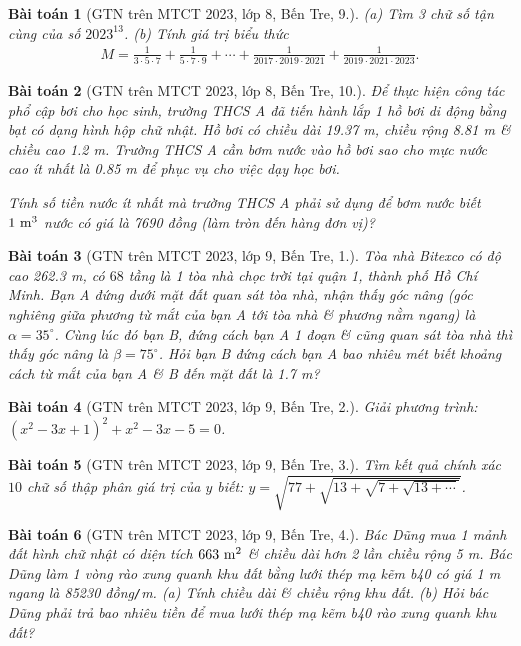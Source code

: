 \documentclass{article}
\newtheorem{baitoan}{Bài toán}
\begin{document}
\begin{baitoan}[GTN trên MTCT 2023, lớp 8, Bến Tre, 9.]
	(a) Tìm 3 chữ số tận cùng của số $2023^{13}$. (b) Tính giá trị biểu thức
	\begin{align*}
		M = \frac{1}{3\cdot5\cdot7} + \frac{1}{5\cdot7\cdot9} + \cdots + \frac{1}{2017\cdot2019\cdot2021} + \frac{1}{2019\cdot2021\cdot2023}.
	\end{align*}
\end{baitoan}

\begin{baitoan}[GTN trên MTCT 2023, lớp 8, Bến Tre, 10.]
	Để thực hiện công tác phổ cập bơi cho học sinh, trường THCS A đã tiến hành lắp 1 hồ bơi di động bằng bạt có dạng hình hộp chữ nhật. Hồ bơi có chiều dài \emph{19.37 m}, chiều rộng \emph{8.81 m} \& chiều cao \emph{1.2 m}. Trường THCS A cần bơm nước vào hồ bơi sao cho mực nước cao ít nhất là \emph{0.85 m} để phục vụ cho việc dạy học bơi.
	
	Tính số tiền nước ít nhất mà trường THCS A phải sử dụng để bơm nước biết $\rm 1\ m^3$ nước có giá là \emph{7690 đồng} (làm tròn đến hàng đơn vị)?
\end{baitoan}

\begin{baitoan}[GTN trên MTCT 2023, lớp 9, Bến Tre, 1.]
	Tòa nhà Bitexco có độ cao \emph{262.3 m}, có $68$ tầng là 1 tòa nhà chọc trời tại quận 1, thành phố Hồ Chí Minh. Bạn A đứng dưới mặt đất quan sát tòa nhà, nhận thấy góc nâng (góc nghiêng giữa phương từ mắt của bạn A tới tòa nhà \& phương nằm ngang) là $\alpha = 35^\circ$. Cùng lúc đó bạn B, đứng cách bạn A 1 đoạn \& cũng quan sát tòa nhà thì thấy góc nâng là $\beta = 75^\circ$. Hỏi bạn B đứng cách bạn A bao nhiêu mét biết khoảng cách từ mắt của bạn A \& B đến mặt đất là \emph{1.7 m}?
\end{baitoan}

\begin{baitoan}[GTN trên MTCT 2023, lớp 9, Bến Tre, 2.]
	Giải phương trình: $(x^2 - 3x + 1)^2 + x^2 - 3x - 5 = 0$.
\end{baitoan}

\begin{baitoan}[GTN trên MTCT 2023, lớp 9, Bến Tre, 3.]
	Tìm kết quả chính xác $10$ chữ số thập phân giá trị của $y$ biết: $y = \sqrt{77 + \sqrt{13 + \sqrt{7 + \sqrt{13 + \cdots}}}}$.
\end{baitoan}

\begin{baitoan}[GTN trên MTCT 2023, lớp 9, Bến Tre, 4.]
	Bác Dũng mua 1 mảnh đất hình chữ nhật có diện tích $\rm663\ m^2$ \& chiều dài hơn 2 lần chiều rộng \emph{5 m}. Bác Dũng làm 1 vòng rào xung quanh khu đất bằng lưới thép mạ kẽm b40 có giá \emph{1 m} ngang là \emph{85230 đồng\texttt{/}m}. (a) Tính chiều dài \& chiều rộng khu đất. (b) Hỏi bác Dũng phải trả bao nhiêu tiền để mua lưới thép mạ kẽm b40 rào xung quanh khu đất? 
\end{baitoan}
\end{document}
